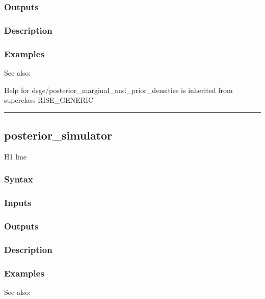 \documentclass[letterpaper,10pt,english]{sphinxmanual}
\begin{document}
\subsubsection{Outputs}
\label{classes/models/@dsge/dsge:id113}

\subsubsection{Description}
\label{classes/models/@dsge/dsge:id114}

\subsubsection{Examples}
\label{classes/models/@dsge/dsge:id115}
See also:

Help for dsge/posterior\_marginal\_and\_prior\_densities is inherited from superclass RISE\_GENERIC


\bigskip\hrule{}\bigskip



\subsection{posterior\_simulator}
\label{classes/models/@dsge/dsge:posterior-simulator}\label{classes/models/@dsge/dsge:id116}
H1 line


\subsubsection{Syntax}
\label{classes/models/@dsge/dsge:id117}

\subsubsection{Inputs}
\label{classes/models/@dsge/dsge:id118}

\subsubsection{Outputs}
\label{classes/models/@dsge/dsge:id119}

\subsubsection{Description}
\label{classes/models/@dsge/dsge:id120}

\subsubsection{Examples}
\label{classes/models/@dsge/dsge:id121}
See also:
\end{document}
